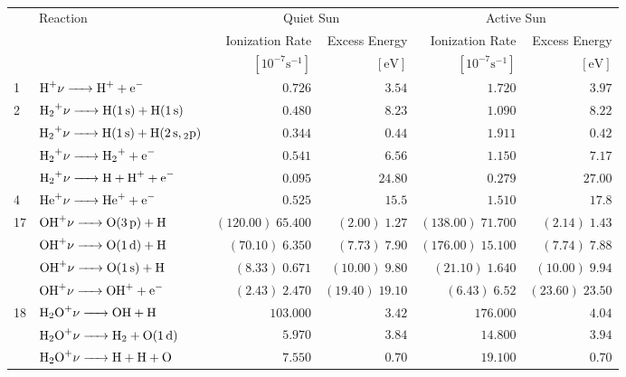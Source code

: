 \documentclass[a4paper, 10pt]{article}
\begin{document}
\begin{table}
	\centering
	\caption{}
	\begin{tabularx}{0.99\textwidth}{lX rrrr}
		\toprule
		 & Reaction & \multicolumn{2}{c}{Quiet Sun} & \multicolumn{2}{c}{Active Sun} \\
		 & & Ionization Rate & Excess Energy & Ionization Rate & Excess Energy \\
		 & & $\left[10^{-7}\si{\second\tothe{-1}}\right]$ & $\left[\si{\electronvolt}\right]$ &  $\left[10^{-7}\si{\second\tothe{-1}}\right]$ & $\left[\si{\electronvolt}\right]$\\
		\midrule
		1 & $\ce{H+$\nu$ -> H+ + e-}$ & $\num{0.726}$ & $\num{3.54}$ & $\num{1.720}$ & $\num{3.97}$ \\
		\midrule
		2 & $\ce{H2+$\nu$ -> H(1s) +H(1s)}$ & $\num{0.480}$ & $\num{8.23}$ & $\num{1.090}$ & $\num{8.22}$ \\
		 & $\ce{H2+$\nu$ -> H(1s) +H(2s,2p)}$& $\num{0.344}$ & $\num{0.44}$ & $\num{1.911}$ & $\num{0.42}$ \\
		 & $\ce{H2+$\nu$ -> H2+ + e-}$ & $\num{0.541}$ & $\num{6.56}$ & $\num{1.150}$ & $\num{7.17}$ \\
		 & $\ce{H2+$\nu$ -> H + H+ +e-}$ & $\num{0.095}$ & $\num{24.80}$ & $\num{0.279}$ & $\num{27.00}$ \\
		\midrule
		4 & $\ce{He+$\nu$ -> He+ + e-}$ & $\num{0.525}$ & $\num{15.5}$ & $\num{1.510}$ & $\num{17.8}$ \\
		\midrule
		17 & $\ce{OH+$\nu$ -> O(3p) + H}$ &$(\num{120.00})\;\num{65.400}$&$(\num{2.00})\;\num{1.27}$ &$(\num{138.00})\;\num{71.700}$&$(\num{2.14})\;\num{1.43}$ \\
		 & $\ce{OH+$\nu$ -> O(1d) + H}$ &$(\num{70.10})\;\num{6.350}$ &$(\num{7.73})\;\num{7.90}$ &$(\num{176.00})\;\num{15.100}$&$(\num{7.74})\;\num{7.88}$ \\
		 & $\ce{OH+$\nu$ -> O(1s) + H}$ &$(\num{8.33})\;\num{0.671}$ &$(\num{10.00})\;\num{9.80}$ &$(\num{21.10})\;\num{1.640}$ &$(\num{10.00})\;\num{9.94}$ \\
		 & $\ce{OH+$\nu$ -> OH+ + e-}$ &$(\num{2.43})\;\num{2.470}$ &$(\num{19.40})\;\num{19.10}$&$(\num{6.43})\;\num{6.52}$ &$(\num{23.60})\;\num{23.50}$\\
		\midrule
		18 & $\ce{H2O+$\nu$ -> OH + H}$ & $\num{103.000}$ & $\num{3.42}$ & $\num{176.000}$ & $\num{4.04}$ \\
		 & $\ce{H2O+$\nu$ -> H2 + O(1d)}$ & $\num{5.970}$ & $\num{3.84}$ & $\num{14.800}$ & $\num{3.94}$ \\
		 & $\ce{H2O+$\nu$ -> H + H + O}$ & $\num{7.550}$ & $\num{0.70}$ & $\num{19.100}$ & $\num{0.70}$ \\

\end{tabularx}
\end{table}
\end{document}

